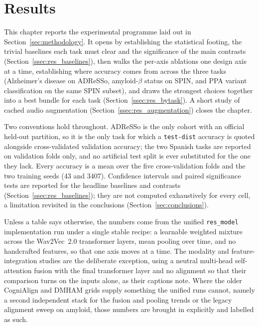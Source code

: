 \clearpage\section{Results}
\label{sec:experiments}

This chapter reports the experimental programme laid out in Section~\ref{sec:methodology}. It opens by establishing the statistical footing, the trivial baselines each task must clear and the significance of the main contrasts (Section~\ref{ssec:res_baselines}), then walks the per-axis ablations one design axis at a time, establishing where accuracy comes from across the three tasks (Alzheimer's disease on ADReSSo, amyloid-$\beta$ status on SPIN, and PPA variant classification on the same SPIN subset), and draws the strongest choices together into a best bundle for each task (Section~\ref{ssec:res_bytask}). A short study of cached audio augmentation (Section~\ref{ssec:res_augmentation}) closes the chapter.

Two conventions hold throughout. ADReSSo is the only cohort with an official held-out partition, so it is the only task for which a \texttt{test-dist} accuracy is quoted alongside cross-validated validation accuracy; the two Spanish tasks are reported on validation folds only, and no artificial test split is ever substituted for the one they lack. Every accuracy is a mean over the five cross-validation folds and the two training seeds (43 and 3407). Confidence intervals and paired significance tests are reported for the headline baselines and contrasts (Section~\ref{ssec:res_baselines}); they are not computed exhaustively for every cell, a limitation revisited in the conclusions (Section~\ref{sec:conclusions}).

Unless a table says otherwise, the numbers come from the unified \texttt{res\_model} implementation run under a single stable recipe: a learnable weighted mixture across the Wav2Vec~2.0 transformer layers, mean pooling over time, and no handcrafted features, so that one axis moves at a time. The modality and feature-integration studies are the deliberate exception, using a neutral multi-head self-attention fusion with the final transformer layer and no alignment so that their comparison turns on the inputs alone, as their captions note. Where the older CogniAlign and DMHAM grids supply something the unified runs cannot, namely a second independent stack for the fusion and pooling trends or the legacy alignment sweep on amyloid, those numbers are brought in explicitly and labelled as such.

